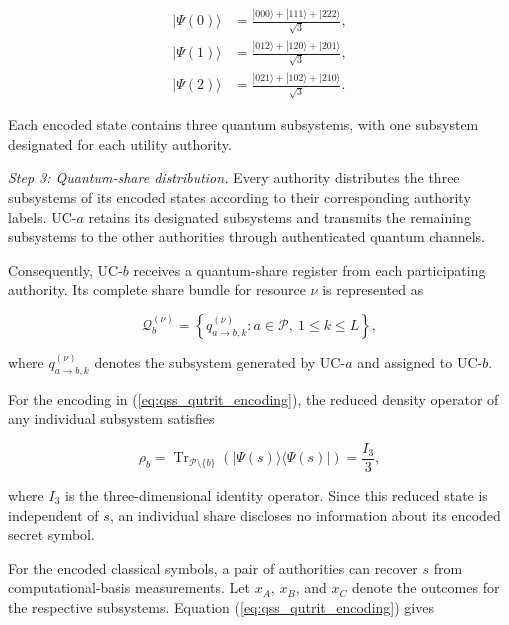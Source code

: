 \documentclass[twocolumn,10pt,journal]{IEEEtran}
\begin{document}
\begin{equation}
\begin{aligned}
|\Psi(0)\rangle
&=\frac{|000\rangle+|111\rangle+|222\rangle}
{\sqrt{3}},\\
|\Psi(1)\rangle
&=\frac{|012\rangle+|120\rangle+|201\rangle}
{\sqrt{3}},\\
|\Psi(2)\rangle
&=\frac{|021\rangle+|102\rangle+|210\rangle}
{\sqrt{3}}.
\end{aligned}
\label{eq:qss_encoded_basis}
\end{equation}

Each encoded state contains three quantum
subsystems, with one subsystem designated
for each utility authority.

\textit{Step 3: Quantum-share distribution.}
Every authority distributes the three subsystems
of its encoded states according to their
corresponding authority labels. UC-$a$ retains
its designated subsystems and transmits the
remaining subsystems to the other authorities
through authenticated quantum channels.

Consequently, UC-$b$ receives a quantum-share
register from each participating authority.
Its complete share bundle for resource $\nu$
is represented as

\begin{equation}
\mathcal{Q}_{b}^{(\nu)}
=
\left\{
q_{a\rightarrow b,k}^{(\nu)}
:
a\in\mathcal{P},\
1\leq k\leq L
\right\},
\label{eq:qss_share_bundle}
\end{equation}

where $q_{a\rightarrow b,k}^{(\nu)}$
denotes the subsystem generated by UC-$a$
and assigned to UC-$b$.

For the encoding in
(\ref{eq:qss_qutrit_encoding}), the reduced
density operator of any individual subsystem
satisfies

\begin{equation}
\rho_b
=
\operatorname{Tr}_{\mathcal{P}\setminus\{b\}}
\left(
|\Psi(s)\rangle
\langle\Psi(s)|
\right)
=
\frac{I_3}{3},
\label{eq:qss_single_share_privacy}
\end{equation}

where $I_3$ is the three-dimensional identity
operator. Since this reduced state is independent of
$s$, an individual share discloses no information
about its encoded secret symbol.

For the encoded classical symbols, a pair of authorities
can recover $s$ from computational-basis measurements.
Let $x_A$, $x_B$, and $x_C$ denote the outcomes for
the respective subsystems. Equation
(\ref{eq:qss_qutrit_encoding}) gives
\end{document}
